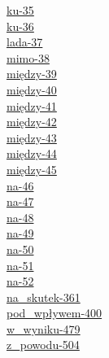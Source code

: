 \documentclass[a4paper, 12pt]{article}
\theoremstyle{remark}
\begin{document}
\begin{multicols}{4}
\hyperref[prep-35]{ku-35}\\
\hyperref[prep-36]{ku-36}\\
\hyperref[prep-37]{lada-37}\\
\hyperref[prep-38]{mimo-38}\\
\hyperref[prep-39]{między-39}\\
\hyperref[prep-40]{między-40}\\
\hyperref[prep-41]{między-41}\\
\hyperref[prep-42]{między-42}\\
\hyperref[prep-43]{między-43}\\
\hyperref[prep-44]{między-44}\\
\hyperref[prep-45]{między-45}\\
\hyperref[prep-46]{na-46}\\
\hyperref[prep-47]{na-47}\\
\hyperref[prep-48]{na-48}\\
\hyperref[prep-49]{na-49}\\
\hyperref[prep-50]{na-50}\\
\hyperref[prep-51]{na-51}\\
\hyperref[prep-52]{na-52}\\
\hyperref[prep-361]{na\_skutek-361}\\
\hyperref[prep-400]{pod\_wpływem-400}\\
\hyperref[prep-479]{w\_wyniku-479}\\
\hyperref[prep-504]{z\_powodu-504}\\
\end{multicols}

\end{document}

